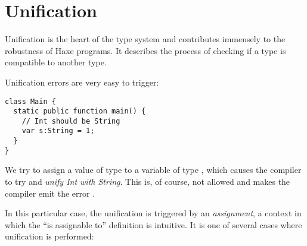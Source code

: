 




\section{Unification}
\label{type-system-unification}


Unification is the heart of the type system and contributes immensely to the robustness of Haxe programs. It describes the process of checking if a type is compatible to another type.


Unification errors are very easy to trigger:

\begin{lstlisting}
class Main {
  static public function main() {
    // Int should be String
    var s:String = 1;
  }
}
\end{lstlisting}
We try to assign a value of type  to a variable of type , which causes the compiler to try and \emph{unify Int with String}. This is, of course, not allowed and makes the compiler emit the error .

In this particular case, the unification is triggered by an \emph{assignment}, a context in which the ``is assignable to'' definition is intuitive. It is one of several cases where unification is performed:


